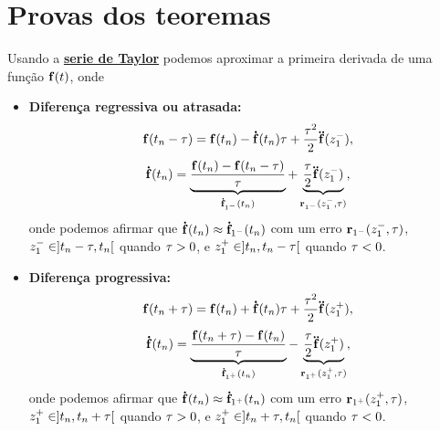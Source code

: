 \section{Provas dos teoremas}


\begin{myproofT}\label{proof:teo:diferenças-finitas:1}
Usando a \hyperref[def:taylor]{\textbf{serie de Taylor}} podemos aproximar 
a primeira derivada de uma função $\VECTOR{f}(t)$, onde
\begin{itemize}
\item \textbf{Diferença regressiva ou atrasada:}
\begin{equation}
\VECTOR{f}(t_n-\ToS) = \VECTOR{f}(t_n)-\DTVECTOR{f}(t_n)\ToS +\frac{\ToS^2}{2}\DDTVECTOR{f}(z_{1}^{-}),
\end{equation}
\begin{equation}
\DTVECTOR{f}(t_n)=\underbrace{\frac{\VECTOR{f}(t_n)-\VECTOR{f}(t_n-\ToS)}{\ToS}}_{\DTVECTOR{f}_{1^{-}}(t_n)}+
\underbrace{\frac{\ToS}{2}\DDTVECTOR{f}(z_{1}^{-})}_{\VECTOR{R}_{1^{-}}(z_{1}^{-},\ToS)},
\end{equation}
onde podemos afirmar que $\DTVECTOR{f}(t_n)\approx \DTVECTOR{f}_{1^{-}}(t_n)$ com um erro $\VECTOR{R}_{1^{-}}(z_{1}^{-},\ToS)$,
$z_{1}^{-} \in ]t_n-\tau,t_n[$ quando $\tau>0$, e $z_{1}^{+} \in ]t_n,t_n-\tau[$ quando $\tau<0$.

\item \textbf{Diferença progressiva:}
\begin{equation}
\VECTOR{f}(t_n+\ToS) = \VECTOR{f}(t_n)+\DTVECTOR{f}(t_n)\ToS +\frac{\ToS^2}{2}\DDTVECTOR{f}(z_{1}^{+}),
\end{equation}
\begin{equation}
\DTVECTOR{f}(t_n)=\underbrace{\frac{\VECTOR{f}(t_n+\ToS) - \VECTOR{f}(t_n)}{\ToS}}_{\DTVECTOR{f}_{1^{+}}(t_n)}-
\underbrace{\frac{\ToS}{2}\DDTVECTOR{f}(z_{1}^{+})}_{\VECTOR{R}_{1^{+}}(z_{1}^{+},\ToS)},
\end{equation}
onde podemos afirmar que $\DTVECTOR{f}(t_n)\approx \DTVECTOR{f}_{1^{+}}(t_n)$ com um erro $\VECTOR{R}_{1^{+}}(z_{1}^{+},\ToS)$,
$z_{1}^{+} \in ]t_n,t_n+\tau[$ quando $\tau>0$, e $z_{1}^{+} \in ]t_n+\tau,t_n[$ quando $\tau<0$.


\end{itemize}
\end{myproofT}
